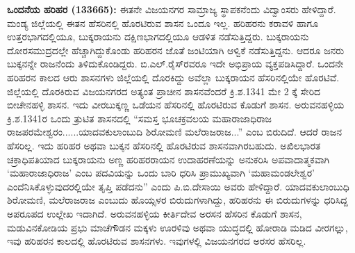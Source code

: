 \textbf{ ಒಂದನೆಯ ಹರಿಹರ (133665):} ಈತನೇ ವಿಜಯನಗರ ಸಾಮ್ರಾಜ್ಯ ಸ್ಥಾಪಕನೆಂದು ವಿದ್ವಾಂಸರು ಹೇಳಿದ್ದಾರೆ. ಮಂಡ್ಯ ಜಿಲ್ಲೆಯಲ್ಲಿ ಈತನ ಹೆಸರಿನಲ್ಲಿ ಹೊರಟಿರುವ ಶಾಸನ ಒಂದೂ ಇಲ್ಲ. ಹರಿಹರನು ಕರಾವಳಿ ಹಾಗೂ ಉತ್ತರಭಾಗದಲ್ಲಿಯೂ, ಬುಕ್ಕರಾಯನು ದಕ್ಷಿಣಭಾಗದಲ್ಲಿಯೂ ಆಡಳಿತ ನಡೆಸುತ್ತಿದ್ದರು. ಬುಕ್ಕರಾಯನು ದೋರಸಮುದ್ರದಲ್ಲೇ ಹೆಚ್ಚಾಗಿದ್ದುಕೊಂಡು ಹರಿಹರನ ಜೊತೆ ಜಂಟಿಯಾಗಿ ಆಳ್ವಿಕೆ ನಡೆಸುತ್ತಿದ್ದನು. ಆದರೂ ಜನರು ಬುಕ್ಕನನ್ನೇ ರಾಜನೆಂದು ತಿಳಿದುಕೊಂಡಿದ್ದರು. ಬಿ.ಎಲ್​.ರೈಸ್​ರವರೂ ಇದೇ ಅಭಿಪ್ರಾಯ ವ್ಯಕ್ತಪಡಿಸಿದ್ದಾರೆ. ಒಂದನೇ ಹರಿಹರನ ಕಾಲದ ಆರು ಶಾಸನಗಳು ಜಿಲ್ಲೆಯಲ್ಲಿ ದೊರಕಿದ್ದು ಅವೆಲ್ಲಾ ಬುಕ್ಕರಾಯನ ಹೆಸರಿನಲ್ಲಿಯೇ ಹೊರಟಿವೆ. ಜಿಲ್ಲೆಯಲ್ಲಿ ದೊರಕಿರುವ ವಿಜಯನಗರದ ಅತ್ಯಂತ ಪ್ರಾಚೀನ ಶಾಸನವೆಂದರೆ ಕ್ರಿ.ಶ.1341 ಮೇ 2 ಕ್ಕೆ ಸೇರಿದ ಬೀಚೇನಹಳ್ಳಿ ಶಾಸನ. ಇದು ವೀರಬುಕ್ಕಣ್ಣ ಒಡೆಯನ ಹೆಸರಿನಲ್ಲಿ ಹೊರಟಿರುವ ಕೊಡುಗೆ ಶಾಸನ. ಅರುವನಹಳ್ಳಿಯ ಕ್ರಿ.ಶ.1341ರ ಒಂದು ತ್ರುಟಿತ ಶಾಸನದಲ್ಲಿ “ಸಮಸ್ತ ಭೂಚಕ್ರವಲಯ ಮಹಾರಾಜಾಧಿರಾಜ ರಾಜಪರಮೇಶ್ವರಂ......ಯಾದವಕುಲಾಂಬುದಿ ಶಿರೋಮಣಿ ಮಲೆರಾಜರಾಜ...” ಎಂಬ ಬಿರುದಿದೆ. ಆದರೆ ರಾಜನ ಹೆಸರಿಲ್ಲ. ಇದು ಹರಿಹರ ಅಥವಾ ಬುಕ್ಕನ ಹೆಸರಿನಲ್ಲಿ ಹೊರಟಿರುವ ಶಾಸನವಾಗಿರಬಹುದು. ಅಖಿಲಭಾರತ ಚಕ್ರಾಧಿಪತಿಯಾದ ಬುಕ್ಕರಾಯನು ಅಣ್ಣ ಹರಿಹರರಾಯನ ಉದಾಹರಣೆಯನ್ನು ಅನುಕರಿಸಿ ಅಪವಾದಾತ್ಮಕವಾಗಿ `ಮಹಾರಾಜಾಧಿರಾಜ’ ಎಂಬ ಪದವಿಯನ್ನು ಒಂದು ಬಾರಿ ಧರಿಸಿ ಪ್ರಾಮುಖ್ಯವಾಗಿ ‘ಮಹಾಮಂಡಲೇಶ್ವರ’ ಎಂದೆನಿಸಿಕೊಳ್ಳು\-ವುದರಲ್ಲಿಯೇ ತೃಪ್ತಿ ಪಡೆದನು” ಎಂದು ಪಿ.ಬಿ.ದೇಸಾಯಿ ಅವರು ಹೇಳಿದ್ದಾರೆ. ಯಾದವಕುಲಾಂಬುಧಿ ಶಿರೋಮಣಿ, ಮಲೆರಾಜರಾಜ ಎಂಬುದು ಹೊಯ್ಸಳರ ಬಿರುದುಗಳಾಗಿದ್ದು, ಹರಿಹರನು ಈ ಬಿರುದುಗಳನ್ನು ಧರಿಸಿದ್ದ ಅಪರೂಪದ ಉಲ್ಲೇಖ ಇದಾಗಿದೆ. ಅರುವನಹಳ್ಳಿಯ ಕೀರ್ತಿದೇವ ಅರಸನ ಹೆಸರಿನ ಕೊಡುಗೆ ಶಾಸನ, ಮಡುವಿನಕೋಡಿಯ ಪ್ರಭು ಮಾಚೆಗೌಡನ ಮಕ್ಕಳು ಊರಳಿವು ಅಥವಾ ಯುದ್ಧದಲ್ಲಿ ಹೋರಾಡಿ ಮಡಿದ ವೀರಗಲ್ಲು, ಇವು ಹರಿಹರನ ಕಾಲದಲ್ಲಿ ಹೊರಟಿರುವ ಶಾಸನಗಳು. ಇವುಗಳಲ್ಲಿ ವಿಜಯನಗರದ ಅರಸರ ಹೆಸರಿಲ್ಲ.

